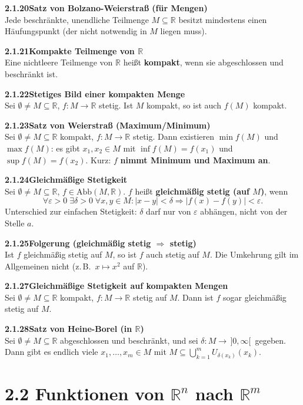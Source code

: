 \documentclass[a4paper,12pt]{article}
\newcommand{\gentry}[3]{%
  \noindent\textbf{#1\quad #2}\nopagebreak\\[0.2em]
  #3\par\smallskip
}
\begin{document}
\gentry{2.1.20}{Satz von Bolzano-Weierstraß (für Mengen)}{%
  Jede beschränkte, unendliche Teilmenge $M \subseteq \mathbb{R}$ besitzt
  mindestens einen Häufungspunkt (der nicht notwendig in $M$ liegen muss).
}

\gentry{2.1.21}{Kompakte Teilmenge von $\mathbb{R}$}{%
  Eine nichtleere Teilmenge von $\mathbb{R}$ heißt \textbf{kompakt}, wenn sie
  abgeschlossen und beschränkt ist.
}

\gentry{2.1.22}{Stetiges Bild einer kompakten Menge}{%
  Sei $\emptyset \neq M \subseteq \mathbb{R}$, $f: M \to \mathbb{R}$ stetig.
  Ist $M$ kompakt, so ist auch $f(M)$ kompakt.
}

\gentry{2.1.23}{Satz von Weierstraß (Maximum/Minimum)}{%
  Sei $\emptyset \neq M \subseteq \mathbb{R}$ kompakt, $f: M \to \mathbb{R}$ stetig.
  Dann existieren $\min f(M)$ und $\max f(M)$: es gibt $x_1, x_2 \in M$ mit
  $\inf f(M) = f(x_1)$ und $\sup f(M) = f(x_2)$. Kurz: $f$ \textbf{nimmt
  Minimum und Maximum an}.
}

\gentry{2.1.24}{Gleichmäßige Stetigkeit}{%
  Sei $\emptyset \neq M \subseteq \mathbb{R}$, $f \in \mathrm{Abb}(M, \mathbb{R})$.
  $f$ heißt \textbf{gleichmäßig stetig (auf $M$)}, wenn
  \[
    \forall \varepsilon > 0\;\exists \delta > 0\;\forall x, y \in M:
    |x - y| < \delta \Rightarrow |f(x) - f(y)| < \varepsilon.
  \]
  Unterschied zur einfachen Stetigkeit: $\delta$ darf nur von $\varepsilon$ abhängen,
  nicht von der Stelle $a$.
}

\gentry{2.1.25}{Folgerung (gleichmäßig stetig $\Rightarrow$ stetig)}{%
  Ist $f$ gleichmäßig stetig auf $M$, so ist $f$ auch stetig auf $M$. Die
  Umkehrung gilt im Allgemeinen nicht (z.\,B.\ $x \mapsto x^2$ auf $\mathbb{R}$).
}

\gentry{2.1.27}{Gleichmäßige Stetigkeit auf kompakten Mengen}{%
  Sei $\emptyset \neq M \subseteq \mathbb{R}$ kompakt, $f: M \to \mathbb{R}$ stetig
  auf $M$. Dann ist $f$ sogar gleichmäßig stetig auf $M$.
}

\gentry{2.1.28}{Satz von Heine-Borel (in $\mathbb{R}$)}{%
  Sei $\emptyset \neq M \subseteq \mathbb{R}$ abgeschlossen und beschränkt,
  und sei $\delta: M \to \,]0, \infty[\,$ gegeben. Dann gibt es endlich viele
  $x_1, \ldots, x_m \in M$ mit
  $M \subseteq \bigcup_{k=1}^m U_{\delta(x_k)}(x_k)$.
}

\section*{2.2 \quad Funktionen von $\mathbb{R}^n$ nach $\mathbb{R}^m$}
\end{document}
